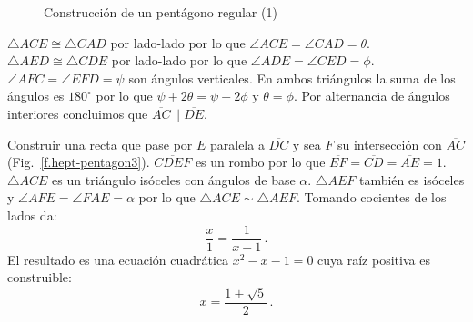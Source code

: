 \begin{figure}[t]
\begin{center}
\end{center}
\caption{Construcción de un pentágono regular (1)}\label{f.hept-pentagon2}
\end{figure}
$\triangle ACE\cong \triangle CAD$ por lado-lado por lo que $\angle ACE=\angle CAD=\theta$. $\triangle AED\cong\triangle CDE$ por lado-lado por lo que $\angle ADE=\angle CED=\phi$. $\angle AFC=\angle EFD=\psi$ son ángulos verticales. En ambos triángulos la suma de los ángulos es $180^\circ$ por lo que
$\psi+2\theta=\psi+ 2\phi$ y $\theta=\phi$.
Por alternancia de ángulos interiores concluimos que $\overline{AC}\parallel \overline{DE}$.

Construir una recta que pase por $E$ paralela a $\overline{DC}$ y sea $F$ su intersección con $\overline{AC}$ (Fig.~\ref{f.hept-pentagon3}). $\overline{CDEF}$ es un rombo por lo que $\overline{EF}=\overline{CD}=\overline{AE}=1$. $\triangle ACE$ es un triángulo isóceles con ángulos de base $\alpha$. $\triangle AEF$ también es isóceles y $\angle AFE=\angle FAE=\alpha$ por lo que $\triangle ACE\sim\triangle AEF$. Tomando cocientes de los lados da:
\[
\frac{x}{1}=\frac{1}{x-1}\,.
\]
El resultado es una ecuación cuadrática $x^2-x-1=0$
cuya raíz positiva es construible:
\[
x=\frac{1+\sqrt{5}}{2}\,.
\]

